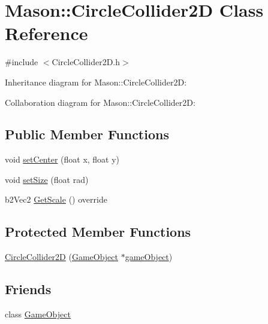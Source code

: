 \hypertarget{class_mason_1_1_circle_collider2_d}{}\section{Mason\+:\+:Circle\+Collider2D Class Reference}
\label{class_mason_1_1_circle_collider2_d}


{\ttfamily \#include $<$Circle\+Collider2\+D.\+h$>$}



Inheritance diagram for Mason\+:\+:Circle\+Collider2D\+:


Collaboration diagram for Mason\+:\+:Circle\+Collider2D\+:
\subsection*{Public Member Functions}
\begin{DoxyCompactItemize}
\item 
void \hyperlink{class_mason_1_1_circle_collider2_d_aa0e943bbb6fb5b9f33110959a845ed76}{set\+Center} (float x, float y)
\item 
void \hyperlink{class_mason_1_1_circle_collider2_d_aa91dcf071566c9862cf1ac385ad9f4a9}{set\+Size} (float rad)
\item 
b2\+Vec2 \hyperlink{class_mason_1_1_circle_collider2_d_a4aa06f3ff8f00445a78f6b6a8b479ad0}{Get\+Scale} () override
\end{DoxyCompactItemize}
\subsection*{Protected Member Functions}
\begin{DoxyCompactItemize}
\item 
\hyperlink{class_mason_1_1_circle_collider2_d_ac713c4259ab552c74b291d0e17f0e98a}{Circle\+Collider2D} (\hyperlink{class_mason_1_1_game_object}{Game\+Object} $\ast$\hyperlink{class_mason_1_1_component_a30030370c35f5562cbbbb0927b0448c8}{game\+Object})
\end{DoxyCompactItemize}
\subsection*{Friends}
\begin{DoxyCompactItemize}
\item 
class \hyperlink{class_mason_1_1_circle_collider2_d_a00df87c957d8f7ee0fc51f07a0542f4a}{Game\+Object}
\end{DoxyCompactItemize}
